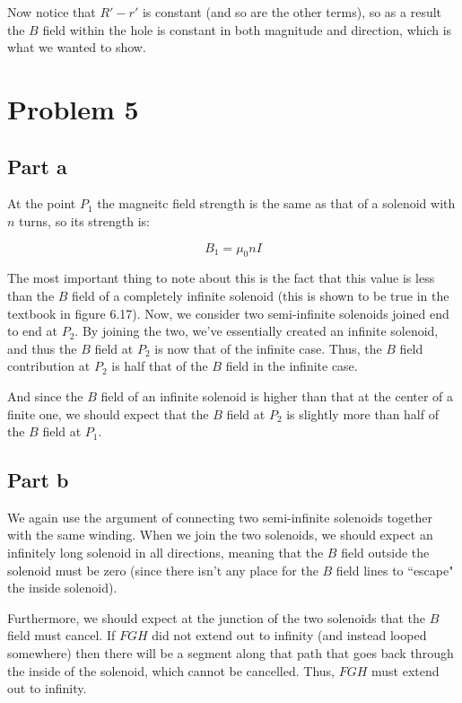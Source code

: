 \documentclass{article}
\theoremstyle{definition}
\numberwithin{equation}{section}
\numberwithin{definition}{section}
\begin{document}
Now notice that $R' - r'$ is constant (and so are the other terms), so as a result the $B$ field within the hole is constant in both magnitude and direction, which is what we wanted to show.

\section{Problem 5}

\subsection{Part a}

At the point $P_1$ the magneitc field strength is the same as that of a solenoid with $n$ turns, so its strength is: 

\[ B_1 = \mu_0 n I\]

The most important thing to note about this is the fact that this value is less than the $B$ field of a completely infinite solenoid (this is shown to be true in the textbook in figure 6.17). Now, we consider two semi-infinite solenoids joined end to end at $P_2$. By joining the two, we've essentially created an infinite solenoid, and thus the $B$ field at $P_2$ is now that of the infinite case. Thus, the $B$ field contribution at $P_2$ is half that of the $B$ field in the infinite case.

And since the $B$ field of an infinite solenoid is higher than that at the center of a finite one, we should expect that the $B$ field at $P_2$ is slightly more than half of the $B$ field at $P_1$.

\subsection{Part b}

We again use the argument of connecting two semi-infinite solenoids together with the same winding. When we join the two solenoids, we should expect an infinitely long solenoid in all directions, meaning that the $B$ field outside the solenoid must be zero (since there isn't any place for the $B$ field lines to ``escape" the inside solenoid). 

Furthermore, we should expect at the junction of the two solenoids that the $B$ field must cancel. If $FGH$ did not extend out to infinity (and instead looped somewhere) then  there will be a segment along that path that goes back through the inside of the solenoid, which cannot be cancelled. Thus, $FGH$ must extend out to infinity.
\end{document}
